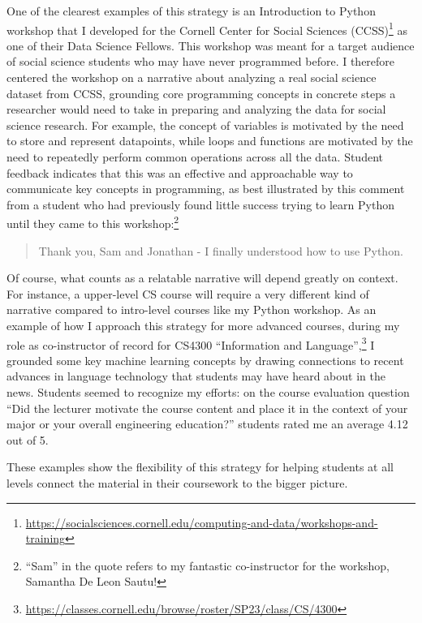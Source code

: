 \documentclass[12pt,letterpaper]{article}
\newcommand\narrativeendsent\lanarrativeend
\newcommand\narrativeendsent\gennarrativeend
\begin{document}
One of the clearest examples of this strategy is an Introduction to Python workshop that I developed for the Cornell Center for Social Sciences (CCSS)\footnote{\url{https://socialsciences.cornell.edu/computing-and-data/workshops-and-training}} as one of their Data Science Fellows.
This workshop was meant for a target audience of social science students who may have never programmed before.
I therefore centered the workshop on a narrative about analyzing a real social science dataset from CCSS, grounding core programming concepts in concrete steps a researcher would need to take in preparing and analyzing the data for social science research.
For example, the concept of variables is motivated by the need to store and represent datapoints, while loops and functions are motivated by the need to repeatedly perform common operations across all the data.
Student feedback indicates that this was an effective and approachable way to communicate key concepts in programming, as best illustrated by this comment from a student who had previously found little success trying to learn Python until they came to this workshop:\footnote{``Sam'' in the quote refers to my fantastic co-instructor for the workshop, Samantha De Leon Sautu!}
\begin{quote}
    Thank you, Sam and Jonathan - I finally understood how to use Python.
\end{quote}

Of course, what counts as a relatable narrative will depend greatly on context.
For instance, a upper-level CS course will require a very different kind of narrative compared to intro-level courses like my Python workshop.
As an example of how I approach this strategy for more advanced courses, during my role as co-instructor of record for CS4300 ``Information and Language'',\footnote{\url{https://classes.cornell.edu/browse/roster/SP23/class/CS/4300}} I grounded some key machine learning concepts by drawing connections to recent advances in language technology that students may have heard about in the news.
Students seemed to recognize my efforts: on the course evaluation question ``Did the lecturer motivate the course content
and place it in the context of your major or your overall engineering
education?'' students rated me an average 4.12 out of 5.

These examples show the flexibility of this strategy for helping students at all levels connect the material in their coursework to the bigger picture.
\narrativeendsent
\end{document}
